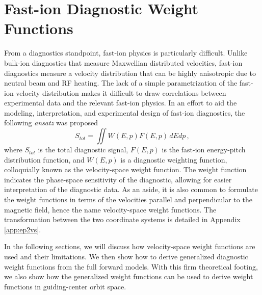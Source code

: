 \chapter{Fast-ion Diagnostic Weight Functions}\label{chap:weights}

From a diagnostics standpoint, fast-ion physics is particularly difficult.
Unlike bulk-ion diagnostics that measure Maxwellian distributed velocities, fast-ion diagnostics  measure a velocity distribution that can be highly anisotropic due to neutral beam and RF heating.
The lack of a simple parametrization of the fast-ion velocity distribution makes it difficult to draw correlations between experimental data and the relevant fast-ion physics.
In an effort to aid the modeling, interpretation, and experimental design of fast-ion diagnostics, the following \textit{ansatz} was proposed\cite{heidbrink2007}
\begin{equation}\label{eq:vs_WF}
    S_{tot} = \iint W(E,p)F(E,p)\,dEdp\,,
\end{equation}
where $S_{tot}$ is the total diagnostic signal, $F(E,p)$ is the fast-ion energy-pitch distribution function, and $W(E,p)$ is a diagnostic weighting function, colloquially known as the velocity-space weight function. The weight function indicates the phase-space sensitivity of the diagnostic, allowing for easier interpretation of the diagnostic data. As an aside, it is also common to formulate the weight functions in terms of the velocities parallel and perpendicular to the magnetic field, hence the name velocity-space weight functions. The transformation between the two coordinate systems is detailed in Appendix \ref{app:ep2vs}.

In the following sections, we will discuss how velocity-space weight functions are used and their limitations. We then show how to derive generalized diagnostic weight functions from the full forward models. With this firm theoretical footing, we also show how the generalized weight functions can be used to derive weight functions in guiding-center orbit space.

